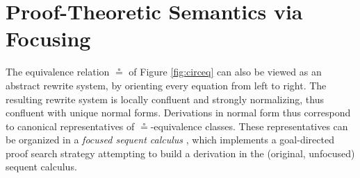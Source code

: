 \documentclass[submission,copyright,creativecommons]{eptcs}
\theoremstyle{definition}
\newcommand{\FSkMCC}{\mathsf{Free}}
\begin{document}

\section{Proof-Theoretic Semantics via Focusing}
\label{sec:focus}
The equivalence relation $\circeq$ of Figure \ref{fig:circeq} can also be viewed as an abstract rewrite system, by orienting every equation from left to right. The resulting rewrite system is locally confluent and strongly normalizing, thus confluent with unique normal forms. Derivations in normal form thus correspond to canonical representatives of $\circeq$-equivalence classes.
These representatives can be organized in a \emph{focused sequent calculus} \cite{andreoli:logic:1992}, which implements a goal-directed proof search strategy attempting to build a derivation in the (original, unfocused) sequent calculus.
\end{document}
